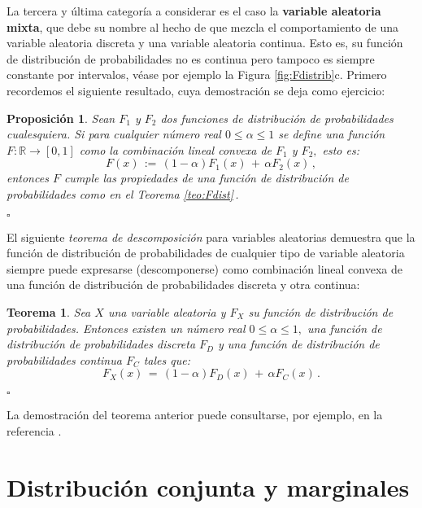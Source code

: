 \documentclass[spanish,10pt,letterpaper]{article}
\newtheorem{teo}{Teorema}
\newtheorem{prop}{Proposición}
\newcommand{\Runo}{\mathbb{R}}
\newcommand{\qed}{\begin{flushright}$\square$\end{flushright}}
\begin{document}
	\bigskip 
	
	La tercera y última categoría a considerar es el caso la \textbf{variable aleatoria mixta}, que debe su nombre al hecho de que mezcla el comportamiento de una variable aleatoria discreta y una variable aleatoria continua. Esto es, su función de distribución de probabilidades no es continua pero tampoco es siempre constante por intervalos, véase por ejemplo la Figura \ref{fig:Fdistrib}c. Primero recordemos el siguiente resultado, cuya demostración se deja como ejercicio:
	
	\medskip
	
	\begin{prop}\label{prop:convexa}
		Sean $F_1$ y $F_2$ dos funciones de distribución de probabilidades cualesquiera. Si para cualquier número real $0\leq\alpha\leq 1$ se define una función $F:\Runo\rightarrow[0,1]$ como la combinación lineal convexa de $F_1$ y $F_2,$ esto es: $$F(x) \,:=\, (1-\alpha)F_1(x) \,+\, \alpha F_2(x)\,,$$ entonces $F$ cumple las propiedades de una función de distribución de probabilidades como en el Teorema \ref{teo:Fdist}\,. \qed
	\end{prop} 
	
	El siguiente \textit{teorema de descomposición} para variables aleatorias demuestra que la función de distribución de probabilidades de cualquier tipo de variable aleatoria siempre puede expresarse (descomponerse) como combinación lineal convexa de una función de distribución de probabilidades discreta y otra continua: 
	
	\medskip 
	
	\begin{teo}\label{teo:descomp}
		Sea $X$ una variable aleatoria y $F_X$ su función de distribución de probabilidades. Entonces existen un número real $0\leq\alpha\leq 1,$ una función de distribución de probabilidades discreta $F_D$ y una función de distribución de probabilidades continua $F_C$ tales que:
		$$F_X(x) \,=\, (1-\alpha)F_D(x) \,+\, \alpha F_C(x)\,.$$ \qed 
	\end{teo} 
	La demostración del teorema anterior puede consultarse, por ejemplo, en la referencia \cite{Domínguez}. 
	
	
	
	
		

\newpage 
\section{Distribución conjunta y marginales}\label{sec:conjuntamarginales}
	
\end{document}
